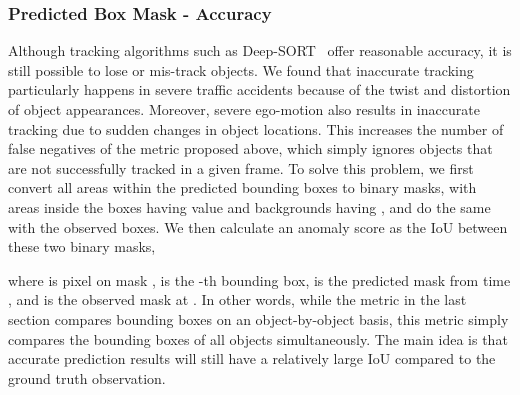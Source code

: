\documentclass[letterpaper, 10 pt, conference]{ieeeconf}
\theoremstyle{definition}
\theoremstyle{remark}
\begin{document}
\subsubsection{Predicted Box Mask - Accuracy}
\label{sec:metrics_two}
Although tracking algorithms such as Deep-SORT~\cite{wojke2017simple}
offer reasonable accuracy, it is still possible
to lose or mis-track objects. We found that inaccurate tracking
particularly happens in severe traffic accidents because of the twist and distortion of
object appearances. Moreover, severe ego-motion also results in
inaccurate tracking due to sudden changes in object 
locations. This increases the number of false negatives of the metric
proposed above, which simply ignores objects that are not
successfully tracked in a given frame.
To solve this problem, 
we first convert all areas within the predicted bounding boxes to
binary masks, with areas inside the boxes having value  and backgrounds having ,
and do the same with the observed boxes.
We then calculate an anomaly score as the IoU between these two binary masks,

where  is pixel  on mask ,  is the
-th bounding box,  is the predicted mask
from time , and  is the observed mask at .
In other words, while the metric in the last section compares bounding
boxes on an object-by-object basis, this metric simply compares the bounding
boxes of all objects simultaneously.
The main idea is that
accurate prediction results will still have a relatively large IoU compared
to the ground truth observation.
\end{document}
